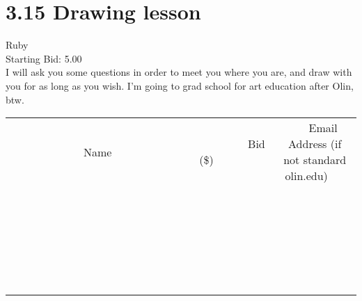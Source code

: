 \documentclass[11pt]{article}
\begin{document}
					\section*{3.15 Drawing lesson}
					Ruby \\
					Starting Bid: 5.00 \\
					I will ask you some questions in order to meet you where you are, and draw with you for as long as you wish. I'm going to grad school for art education after Olin, btw. \\
					[6ex]
					\begin{tabular}{c c c}
						~~~~~~~~~~~~~Name~~~~~~~~~~~~~ & ~~~~~~~~~Bid (\$)~~~~~~~~~ & ~~~Email Address (if not standard olin.edu)~~~ \\
				
 & & \\
\hline
 & & \\
\hline
 & & \\
\hline
 & & \\
\hline
 & & \\
\hline
 & & \\
\hline
 & & \\
\hline
 & & \\
\hline
 & & \\
\hline
 & & \\
\hline
 & & \\
\hline
 & & \\
\hline
 & & \\
\hline
 & & \\
\hline
 & & \\
\hline
 & & \\
\hline
 & & \\
\hline
 & & \\
\hline
 & & \\
\hline
 & & \\
\hline
 & & \\
\hline
 & & \\
\hline
 & & \\
\hline
 & & \\
\hline
 & & \\
\hline
 & & \\
\hline
					\end{tabular}
					\clearpage
				
\end{document}
